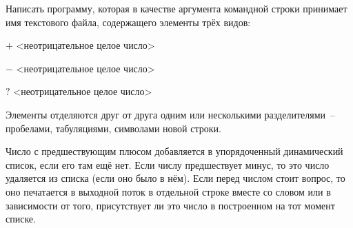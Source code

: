 

Написать программу, которая в качестве аргумента командной строки
принимает имя текстового файла, содержащего элементы трёх видов:
\begin{description}
\item{$+$} <неотрицательное целое число>
\item{$-$} <неотрицательное целое число>
\item{$?$} <неотрицательное целое число>
\end{description}

Элементы отделяются друг от друга одним или несколькими
разделителями~-- пробелами, табуляциями, символами новой строки.

Число
с предшествующим плюсом добавляется в упорядоченный динамический
список, если его там ещё нет. Если числу предшествует минус, то это число
удаляется из списка (если оно было в нём). Если перед числом стоит
вопрос, то оно печатается в выходной поток в отдельной строке вместе со
словом  или  в зависимости от того, присутствует ли это число в
построенном на тот момент списке.
